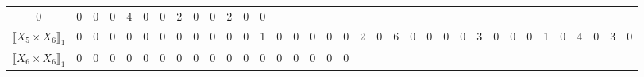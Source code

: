 \documentclass[12pt]{article}
\theoremstyle{definition}
\theoremstyle{remark}
\begin{document}
{\begin{table}[H]
\begin{adjustbox}{angle=90}
{\begin{tabular}{c||c|c|c|c|c|c|c|c|c|c|c|c|c|c|c|c|c|c|c|c|c|c|c|c|c|c|c|c|c|c|c|c|c|c}
0  & %
0  & %
0  & %
0  & %
4  & %
0  & %
0  & %
2  & %
0  & %
0  & %
2  & %
0  & %
0   %
\\
$\llbracket X_5 \times X_6 \rrbracket_1$ &
0  & %
0  & %
0  & %
0  & %
0  & %
0  & %
0  & %
0  & %
0  & %
0  & %
0  & %
1  & %
0  & %
0  & %
0  & %
0  & %
0  & %
2  & %
0  & %
6  & %
0  & %
0  & %
0  & %
0  & %
3  & %
0  & %
0  & %
0  & %
1  & %
0  & %
4  & %
0  & %
3  & %
0   %
\\
$\llbracket X_6 \times X_6 \rrbracket_1$ &
0  & %
0  & %
0  & %
0  & %
0  & %
0  & %
0  & %
0  & %
0  & %
0  & %
0  & %
0  & %
0  & %
0  & %
0  & %
0  & %
0  & %

\end{tabular}}
\end{adjustbox}
\end{table}}
\end{document}

